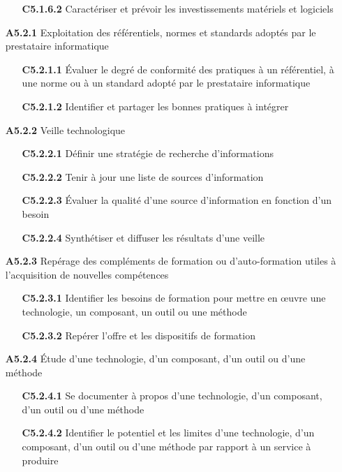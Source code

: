 \documentclass[12pt,a4paper,oneside,titlepage,final]{article}
\begin{document}
\begin{enumerate}
\begin{itemize}
    \item [\textbf{C5.1.6.2}] Caractériser et prévoir les
    investissements matériels et logiciels
  \end{itemize}
  \item [\textbf{A5.2.1}] Exploitation des référentiels, normes et
  standards adoptés par le prestataire informatique
  \begin{itemize}
    \item [\textbf{C5.2.1.1}] Évaluer le degré de conformité des
    pratiques à un référentiel, à une norme ou à un standard adopté
    par le prestataire informatique
    \item [\textbf{C5.2.1.2}] Identifier et partager les bonnes
    pratiques à intégrer
  \end{itemize}
  \item [\textbf{A5.2.2}] Veille technologique
  \begin{itemize}
    \item [\textbf{C5.2.2.1}] Définir une stratégie de recherche
    d'informations
    \item [\textbf{C5.2.2.2}] Tenir à jour une liste de sources
    d'information
    \item [\textbf{C5.2.2.3}] Évaluer la qualité d'une source
    d'information en fonction d'un besoin
    \item [\textbf{C5.2.2.4}] Synthétiser et diffuser les résultats
    d'une veille
  \end{itemize}
  \item [\textbf{A5.2.3}] Repérage des compléments de formation ou
  d'auto-formation utiles à l'acquisition de nouvelles compétences
  \begin{itemize}
    \item [\textbf{C5.2.3.1}] Identifier les besoins de
    formation pour mettre en œuvre une technologie, un composant, un
    outil ou une méthode
    \item [\textbf{C5.2.3.2}] Repérer l'offre et les dispositifs de
    formation
  \end{itemize}
  \item [\textbf{A5.2.4}] Étude d'une technologie, d'un composant,
  d'un outil ou d'une méthode
  \begin{itemize}
    \item [\textbf{C5.2.4.1}] Se documenter à propos d'une
    technologie, d'un composant, d'un outil ou d'une méthode
    \item [\textbf{C5.2.4.2}] Identifier le potentiel et les limites
    d'une technologie, d'un composant, d'un outil ou d'une méthode par
    rapport à un service à produire
  \end{itemize}
\end{enumerate}

\clearpage%
\printbibheading%
\printbibliography[nottype=online,check=notonline,heading=subbibliography,title={Bibliographiques}]
\printbibliography[check=online,heading=subbibliography,title={Webographiques}]

\printglossaries%
\end{document}
